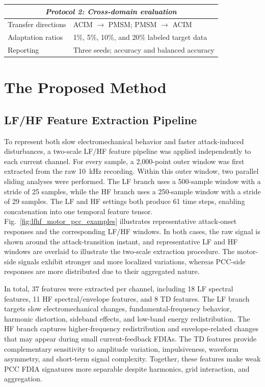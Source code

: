 \documentclass[lettersize,journal]{IEEEtran}
\begin{document}
\begin{table}[t]
\begin{tabularx}{\columnwidth}{@{}p{}X@{}}
\hline
\multicolumn{2}{c}{\textit{Protocol 2: Cross-domain evaluation}} \\
\hline
Transfer directions & ACIM $\rightarrow$ PMSM; PMSM $\rightarrow$ ACIM \\
Adaptation ratios   & 1\%, 5\%, 10\%, and 20\% labeled target data \\
Reporting           & Three seeds; accuracy and balanced accuracy \\

\bottomrule
\end{tabularx}
\end{table}

\section{The Proposed Method}
\label{sec:method}

\subsection{LF/HF Feature Extraction Pipeline}
\label{sec:lfhf_features}


To represent both slow electromechanical behavior and faster attack-induced disturbances, a two-scale LF/HF feature pipeline was applied independently to each current channel. For every sample, a 2{,}000-point outer window was first extracted from the raw 10~kHz recording. Within this outer window, two parallel sliding analyses were performed. The LF branch uses a 500-sample window with a stride of 25 samples, while the HF branch uses a 250-sample window with a stride of 29 samples. The LF and HF settings both produce 61 time steps, enabling concatenation into one temporal feature tensor. 
Fig.~\ref{fig:lfhf_motor_pcc_examples} illustrates representative attack-onset responses and the corresponding LF/HF windows. In both cases, the raw signal is shown around the attack-transition instant, and representative LF and HF windows are overlaid to illustrate the two-scale extraction procedure. The motor-side signals exhibit stronger and more localized variations, whereas PCC-side responses are more distributed due to their aggregated nature.

In total, 37 features were extracted per channel, including 18 LF spectral features, 11 HF spectral/envelope features, and 8 TD features. The LF branch targets slow electromechanical changes, fundamental-frequency behavior, harmonic distortion, sideband effects, and low-band energy redistribution. The HF branch captures higher-frequency redistribution and envelope-related changes that may appear during small current-feedback FDIAs. The TD features provide complementary sensitivity to amplitude variation, impulsiveness, waveform asymmetry, and short-term signal complexity.
Together, these features make weak PCC FDIA signatures more separable despite harmonics, grid interaction, and aggregation.
\end{document}
